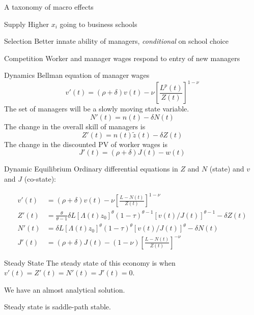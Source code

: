 \documentclass[
  ignorenonframetext,
  aspectratio=1610,
]{beamer}
\begin{document}
\begin{frame}{A taxonomy of macro effects}
\protect\hypertarget{a-taxonomy-of-macro-effects}{}
\begin{block}{Supply}
\protect\hypertarget{supply-1}{}
Higher \(x_i\) going to business schools
\end{block}

\begin{block}{Selection}
\protect\hypertarget{selection-1}{}
Better innate ability of managers, \emph{conditional} on school choice
\end{block}

\begin{block}{Competition}
\protect\hypertarget{competition-1}{}
Worker and manager wages respond to entry of new managers
\end{block}
\end{frame}

\begin{frame}{Dynamics}
\protect\hypertarget{dynamics}{}
Bellman equation of manager wages
\[v'(t) = (\rho+\delta) v(t) - \nu \left[\frac {L^{p}(t)}{Z(t)}\right]^{1-\nu}\]
The set of managers will be a slowly moving state variable.
\[N'(t) = n(t) - \delta N(t)\] The change in the overall skill of
managers is \[Z'(t) = n(t)\tilde z(t) - \delta Z(t)\] The change in the
discounted PV of worker wages is \[J'(t)=(\rho+\delta)J(t)-w(t)\]
\end{frame}

\begin{frame}{Dynamic Equilibrium}
\protect\hypertarget{dynamic-equilibrium}{}
Ordinary differential equations in \(Z\) and \(N\) (state) and \(v\) and
\(J\) (co-state):

\begin{align*}
v'(t) &= (\rho+\delta) v(t) - \nu \left[\frac {L - N(t)}{Z(t)}\right]^{1-\nu} \\
Z'(t) &= \frac{\theta}{\theta-1} \delta L [\Lambda(t)z_0]^\theta (1-\tau)^{\theta-1} [v(t)/J(t)]^{\theta-1} - \delta Z(t) \\
N'(t) &= \delta L [\Lambda(t)z_0]^\theta (1-\tau)^{\theta} [v(t)/J(t)]^\theta - \delta N(t) \\
J'(t) &= (\rho+\delta) J(t) - (1-\nu) \left[\frac {L - N(t)}{Z(t)}\right]^{-\nu}
\end{align*}
\end{frame}

\begin{frame}{Steady State}
\protect\hypertarget{steady-state}{}
The steady state of this economy is when
\(v'(t) = Z'(t) = N'(t) = J'(t) = 0\).

We have an almost analytical solution.

Steady state is saddle-path stable.
\end{frame}
\end{document}
